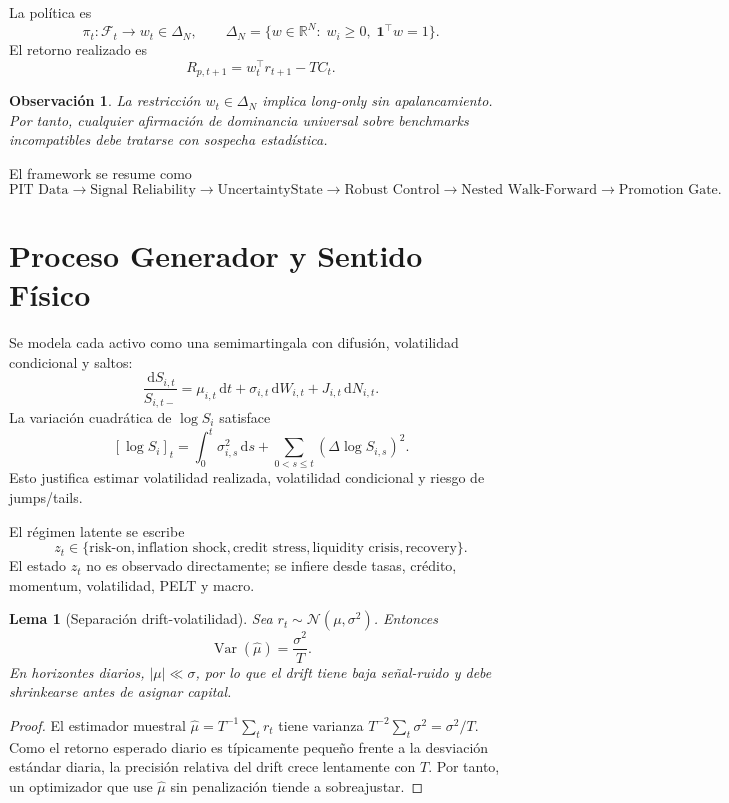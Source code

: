 \documentclass[11pt,letterpaper]{article}
\newtheorem{lemma}{Lema}
\newtheorem{remark}{Observación}
\DeclareMathOperator{\Var}{Var}
\newcommand{\R}{\mathbb{R}}
\newcommand{\F}{\mathcal{F}}
\newcommand{\1}{\mathbbm{1}}
\newcommand{\dd}{\,\mathrm{d}}
\begin{document}
La política es
\[
  \pi_t:\F_t\longrightarrow w_t\in\Delta_N,
  \qquad
  \Delta_N=\{w\in\R^N:\;w_i\ge0,\;\mathbf{1}^\top w=1\}.
\]
El retorno realizado es
\[
  R_{p,t+1}=w_t^\top r_{t+1}-TC_t.
\]

\begin{remark}
La restricción \(w_t\in\Delta_N\) implica long-only sin apalancamiento. Por tanto, cualquier afirmación de dominancia universal sobre benchmarks incompatibles debe tratarse con sospecha estadística.
\end{remark}

El framework se resume como
\[
\text{PIT Data}
\rightarrow
\text{Signal Reliability}
\rightarrow
\text{UncertaintyState}
\rightarrow
\text{Robust Control}
\rightarrow
\text{Nested Walk-Forward}
\rightarrow
\text{Promotion Gate}.
\]

\section{Proceso Generador y Sentido Físico}

Se modela cada activo como una semimartingala con difusión, volatilidad condicional y saltos:
\[
  \frac{\dd S_{i,t}}{S_{i,t-}}
  =
  \mu_{i,t}\dd t
  +
  \sigma_{i,t}\dd W_{i,t}
  +
  J_{i,t}\dd N_{i,t}.
\]
La variación cuadrática de \(\log S_i\) satisface
\[
  [\log S_i]_t
  =
  \int_0^t \sigma_{i,s}^2\dd s
  +
  \sum_{0<s\le t}(\Delta\log S_{i,s})^2.
\]
Esto justifica estimar volatilidad realizada, volatilidad condicional y riesgo de jumps/tails.

El régimen latente se escribe
\[
  z_t\in
  \{
  \text{risk-on},
  \text{inflation shock},
  \text{credit stress},
  \text{liquidity crisis},
  \text{recovery}
  \}.
\]
El estado \(z_t\) no es observado directamente; se infiere desde tasas, crédito, momentum, volatilidad, PELT y macro.

\begin{lemma}[Separación drift-volatilidad]
Sea \(r_t\sim \mathcal{N}(\mu,\sigma^2)\). Entonces
\[
  \Var(\hat{\mu})=\frac{\sigma^2}{T}.
\]
En horizontes diarios, \(|\mu|\ll\sigma\), por lo que el drift tiene baja señal-ruido y debe shrinkearse antes de asignar capital.
\end{lemma}

\begin{proof}
El estimador muestral \(\hat{\mu}=T^{-1}\sum_t r_t\) tiene varianza \(T^{-2}\sum_t \sigma^2=\sigma^2/T\). Como el retorno esperado diario es típicamente pequeño frente a la desviación estándar diaria, la precisión relativa del drift crece lentamente con \(T\). Por tanto, un optimizador que use \(\hat{\mu}\) sin penalización tiende a sobreajustar.
\end{proof}
\end{document}
